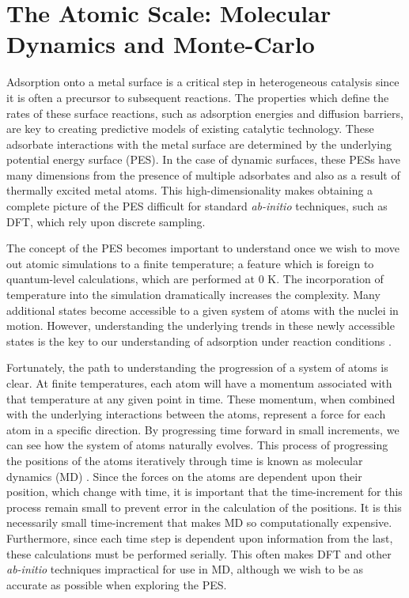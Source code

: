 \documentclass[12pt]{cmuthesis}
\begin{document}
\section{The Atomic Scale: Molecular Dynamics and Monte-Carlo}
\label{sec:org05c2efe}
Adsorption onto a metal surface is a critical step in heterogeneous catalysis since it is often a precursor to subsequent reactions. The properties which define the rates of these surface reactions, such as adsorption energies and diffusion barriers, are key to creating predictive models of existing catalytic technology. These adsorbate interactions with the metal surface are determined by the underlying potential energy surface (PES). In the case of dynamic surfaces, these PESs have many dimensions from the presence of multiple adsorbates and also as a result of thermally excited metal atoms. This high-dimensionality makes obtaining a complete picture of the PES difficult for standard \emph{ab-initio} techniques, such as DFT, which rely upon discrete sampling.

The concept of the PES becomes important to understand once we wish to move out atomic simulations to a finite temperature; a feature which is foreign to quantum-level calculations, which are performed at 0 K. The incorporation of temperature into the simulation dramatically increases the complexity. Many additional states become accessible to a given system of atoms with the nuclei in motion. However, understanding the underlying trends in these newly accessible states is the key to our understanding of adsorption under reaction conditions \cite{rogal-2007-ab-initio,shi-2007-first-princ}.

Fortunately, the path to understanding the progression of a system of atoms is clear. At finite temperatures, each atom will have a momentum associated with that temperature at any given point in time. These momentum, when combined with the underlying interactions between the atoms, represent a force for each atom in a specific direction. By progressing time forward in small increments, we can see how the system of atoms naturally evolves.  This process of progressing the positions of the atoms iteratively through time is known as molecular dynamics (MD) \cite{haile-1992-molec}. Since the forces on the atoms are dependent upon their position, which change with time, it is important that the time-increment for this process remain small to prevent error in the calculation of the positions. It is this necessarily small time-increment that makes MD so computationally expensive. Furthermore, since each time step is dependent upon information from the last, these calculations must be performed serially. This often makes DFT and other \emph{ab-initio} techniques impractical for use in MD, although we wish to be as accurate as possible when exploring the PES.
\end{document}
